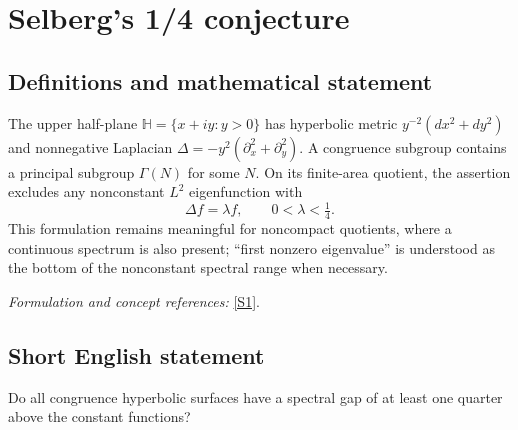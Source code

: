 \documentclass[11pt]{article}
\newcommand{\sref}[2]{\hyperlink{source:#1:#2}{[S#2]}}
\newif\ifshowcatalogue
\newcommand{\cataloguescope}[1]{\ifshowcatalogue
 \paragraph{Exact scope in the supplied catalogue.}
 \begin{quote}\small #1\end{quote}\fi}
\begin{document}
\setcounter{section}{0}
\clearpage
\section*{\texorpdfstring{Selberg's 1/4 conjecture}{Selberg's 1/4 conjecture}}\label{statement}
\subsection{Definitions and mathematical statement}
The upper half-plane $\mathbb H=\{x+iy:y>0\}$ has hyperbolic metric $y^{-2}(dx^2+dy^2)$ and nonnegative Laplacian $\Delta=-y^2(\partial_x^2+\partial_y^2)$. A congruence subgroup contains a principal subgroup $\Gamma(N)$ for some $N$. On its finite-area quotient, the assertion excludes any nonconstant $L^2$ eigenfunction with
\[
 \Delta f=\lambda f,\qquad0<\lambda<\tfrac14.
\]
This formulation remains meaningful for noncompact quotients, where a continuous spectrum is also present; ``first nonzero eigenvalue'' is understood as the bottom of the nonconstant spectral range when necessary.
\par\smallskip\textit{Formulation and concept references:} \sref{statement}{1}.
\cataloguescope{Prove that the first nonzero eigenvalue lambda\_1 of the Laplace-Beltrami operator on every congruence quotient of the upper half-plane is at least 1/4.}
\subsection{Short English statement}
Do all congruence hyperbolic surfaces have a spectral gap of at least one quarter above the constant functions?
\end{document}
